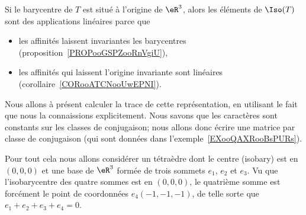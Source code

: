 Si le barycentre de \( T\) est situé à l'origine de \( \eR^3\), alors les éléments de \( \Iso(T)\) sont des applications linéaires parce que
\begin{itemize}
    \item les affinités laissent invariantes les barycentres (proposition~\ref{PROPooGSPZooRnVgiU}),
    \item les affinités qui laissent l'origine invariante sont linéaires (corollaire~\ref{CORooATCNooUwEPNI}).
\end{itemize}
Nous allons à présent calculer la trace de cette représentation, en utilisant le fait que nous la connaissions explicitement. Nous savons que les caractères sont constants sur les classes de conjugaison; nous allons donc écrire une matrice par classe de conjugaison (qui sont données dans l'exemple~\ref{EXooQAXRooBsPURs}).

Pour tout cela nous allons considérer un tétraèdre dont le centre (isobary) est en \( (0,0,0)\) et une base de \( \eR^3\) formée de trois sommets \( e_1\), \( e_2\) et \( e_3\). Vu que l'isobarycentre des quatre sommes est en \( (0,0,0)\), le quatrième somme est forcément le point de coordonnées \( e_4(-1,-1,-1)\), de telle sorte que \( e_1+e_2+e_3+e_4=0\).

